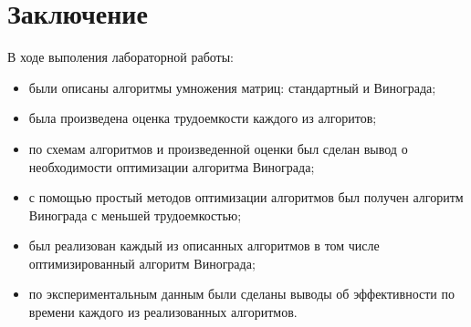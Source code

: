\chapter*{Заключение}

В ходе выполения лабораторной работы:

\begin{itemize}[left=\parindent]
    \item были описаны алгоритмы умножения матриц: стандартный и Винограда;
    \item была произведена оценка трудоемкости каждого из алгоритов;
    \item по схемам алгоритмов и произведенной оценки был сделан вывод
     о необходимости оптимизации алгоритма Винограда;
    \item с помощью простый методов оптимизации алгоритмов был получен
    алгоритм Винограда с меньшей трудоемкостью;
    \item был реализован каждый из описанных алгоритмов в том числе 
    оптимизированный алгоритм Винограда;
    \item по экспериментальным данным были сделаны выводы об эффективности по 
    времени каждого из реализованных алгоритмов.
\end{itemize}